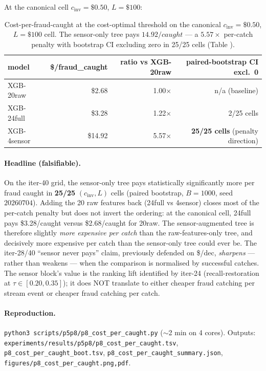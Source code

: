 At the canonical cell $c_\text{inv}{=}\$0.50$, $L{=}\$100$:

\begin{table}[h]
\centering\small
\caption{Cost-per-fraud-caught at the cost-optimal threshold on the
canonical $c_\text{inv}{=}\$0.50$, $L{=}\$100$ cell. The sensor-only
tree pays $14.92/caught$ --- a $5.57\times$ per-catch penalty with
bootstrap CI excluding zero in 25/25 cells (Table
).}
\label{tab:p8-cost-per-caught}
\begin{tabular}{lrrr}
\toprule
model & \$/fraud\_caught & ratio vs XGB-20raw & paired-bootstrap CI excl.\ 0 \\
\midrule
XGB-20raw       & \$2.68  & 1.00$\times$ & n/a (baseline) \\
XGB-24full      & \$3.28  & 1.22$\times$ & 2/25 cells \\
XGB-4sensor     & \$14.92 & 5.57$\times$ & \textbf{25/25 cells} (penalty direction) \\
\bottomrule
\end{tabular}
\end{table}

\paragraph{Headline (falsifiable).}
On the iter-40 grid, the sensor-only tree pays statistically
significantly more per fraud caught in \textbf{25/25} $(c_\text{inv},
L)$ cells (paired bootstrap, $B{=}1000$, seed $20260704$). Adding
the 20 raw features back (24full vs 4sensor) closes most of the per-catch
penalty but does not invert the ordering: at the canonical cell,
24full pays \$3.28/caught versus \$2.68/caught for 20raw. The
sensor-augmented tree is therefore slightly \emph{more expensive per
catch} than the raw-features-only tree, and decisively more
expensive per catch than the sensor-only tree could ever be. The
iter-28/40 ``sensor never pays'' claim, previously defended on
\$/dec, \emph{sharpens} --- rather than weakens --- when the
comparison is normalised by successful catches. The sensor block's
value is the ranking lift identified by iter-24 (recall-restoration
at $\tau \in [0.20, 0.35]$); it does NOT translate to either cheaper
fraud catching per stream event or cheaper fraud catching per
catch.

\paragraph{Reproduction.}
\texttt{python3 scripts/p5p8/p8\_cost\_per\_caught.py}
($\sim$2 min on 4 cores). Outputs:
\texttt{experiments/results/p5p8/p8\_cost\_per\_caught.tsv},
\texttt{p8\_cost\_per\_caught\_boot.tsv},
\texttt{p8\_cost\_per\_caught\_summary.json},
\texttt{figures/p8\_cost\_per\_caught.{png,pdf}}.


